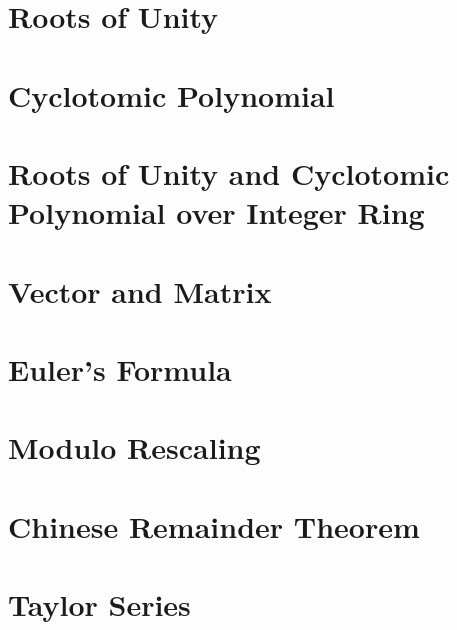 \documentclass[11pt]{article}
\begin{document}
\clearpage

\section{Roots of Unity}
\label{sec:roots}


\clearpage

\section{Cyclotomic Polynomial}
\label{sec:cyclotomic}


\clearpage

\section{Roots of Unity and Cyclotomic Polynomial over Integer Ring}
\label{sec:cyclotomic-polynomial-integer-ring}


\clearpage

\section{Vector and Matrix}
\label{sec:matrix}


\clearpage

\section{Euler's Formula}
\label{sec:euler}


\clearpage

\section{Modulo Rescaling}
\label{sec:modulus-rescaling}


\clearpage

\section{Chinese Remainder Theorem}
\label{sec:chinese-remainder}


\clearpage

\section{Taylor Series}
\label{sec:taylor-series}

\end{document}
